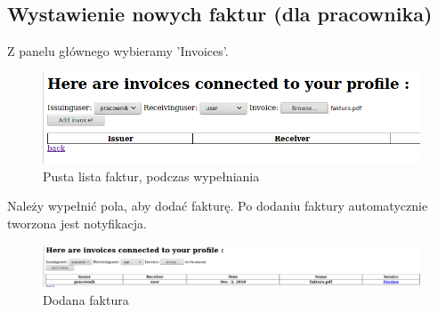\documentclass[12pt]{article}
\begin{document}
	\subsection{Wystawienie nowych faktur (dla pracownika)}
	Z panelu głównego wybieramy 'Invoices'.
	\begin{figure}[H]
		\centering
		\includegraphics[scale=0.5]{img/7.png}
		\caption{Pusta lista faktur, podczas wypełniania}
	\end{figure}
	Należy wypełnić pola, aby dodać fakturę. Po dodaniu faktury automatycznie tworzona jest notyfikacja.
	\begin{figure}[H]
		\centering
		\includegraphics[scale=0.3]{img/8.png}
		\caption{Dodana faktura}
	\end{figure}
\end{document}
